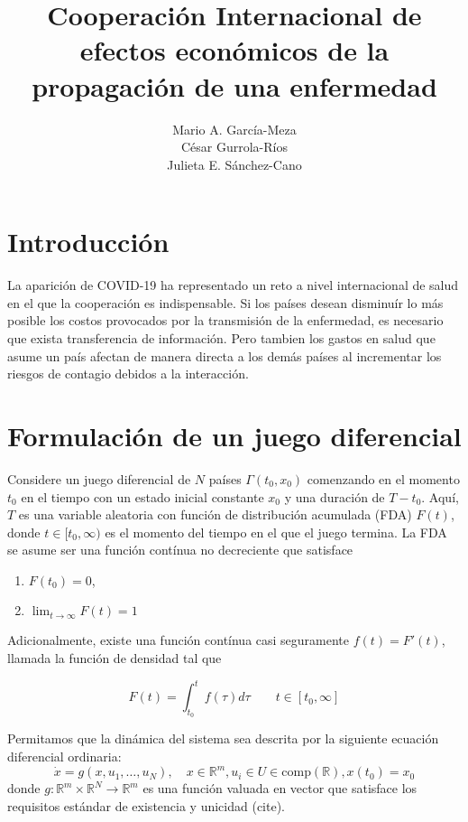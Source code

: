 \documentclass[11pt, oneside]{article}
\title{Cooperación Internacional de efectos económicos de la propagación de una enfermedad}
\author{Mario A. García-Meza\\ César Gurrola-Ríos \\ Julieta E. Sánchez-Cano}
\begin{document}
\maketitle


\section{Introducción}

La aparición de COVID-19 ha representado un reto a nivel internacional de salud en el que la cooperación es indispensable. Si los países desean disminuír lo más posible los costos provocados por la transmisión de la enfermedad, es necesario que exista transferencia de información. Pero tambien los gastos en salud que asume un país afectan de manera directa a los demás países al incrementar los riesgos de contagio debidos a la interacción.

\section{Formulación de un juego diferencial}

Considere un juego diferencial de $N$ países $\Gamma(t_0,x_0)$ comenzando en el momento $t_0$ en el tiempo con un estado inicial constante $x_0$ y una duración de $T-t_0$. Aquí, $T$ es una variable aleatoria con función de distribución acumulada (FDA) $F(t)$, donde $t\in[t_0,\infty)$ es el momento del tiempo en el que el juego termina. La FDA se asume ser una función contínua no decreciente que satisface

\begin{enumerate}
	\item $F(t_0) = 0$,
	\item $\lim_{t\to\infty}F(t)=1$
\end{enumerate}

Adicionalmente, existe una función contínua casi seguramente $f(t) = F'(t)$, llamada la función de densidad tal que

\begin{equation}
	F(t) = \int_{t_0}^t f(\tau)d\tau \qquad t \in [t_0,\infty]
\end{equation}

Permitamos que la dinámica del sistema sea descrita por la siguiente ecuación diferencial ordinaria:
\begin{equation}
	\dot{x} = g(x, u_1,\dots,u_N), \quad x\in\mathbb{R}^m, u_i \in U\in \mbox{comp}(\mathbb{R}), x(t_0) = x_0
\end{equation}
donde $g : \mathbb{R}^m\times \mathbb{R}^N \to \mathbb{R}^m$ es una función valuada en vector que satisface los requisitos estándar de existencia y unicidad (cite).
\end{document}
